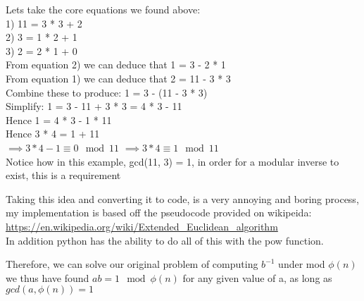 \documentclass[aspectratio=169]{beamer}
\begin{document}
\begin{frame}
    \begin{center}
        Lets take the core equations we found above:\\
        1) 11 = 3 * 3 + 2\\
        2) 3 = 1 * 2 + 1\\
        3) 2 = 2 * 1 + 0\\

        From equation 2) we can deduce that 1 = 3 - 2 * 1\\
        From equation 1) we can deduce that 2 = 11 - 3 * 3\\
        Combine these to produce: 1 = 3 - (11 - 3 * 3)\\
        Simplify: 1 = 3 - 11 + 3 * 3 = 4 * 3 - 11\\
        Hence 1 = 4 * 3 - 1 * 11\\
        Hence 3 * 4 = 1 + 11\\
        $\implies 3*4 - 1 \equiv 0 \mod 11$  
        $\implies 3*4 \equiv 1 \mod 11$\\ 
        Notice how in this example, gcd(11, 3) = 1, in order for a modular inverse to exist, this is a requirement
    \end{center}
\end{frame}

\begin{frame}
    \begin{center}
        Taking this idea and converting it to code, is a very annoying and boring process, my implementation is based off the pseudocode provided on wikipeida: \url{https://en.wikipedia.org/wiki/Extended_Euclidean_algorithm}\\
        \vspace{5mm}
        In addition python has the ability to do all of this with the pow function.
    \end{center}
\end{frame}

\begin{frame}
    \begin{center}
        Therefore, we can solve our original problem of computing $b^{-1}$ under mod $\phi(n)$ we thus have found $ab = 1 \mod \phi(n)$ for any given value of a, as long as $gcd(a, \phi(n)) = 1$
    \end{center}
\end{frame}
\end{document}
